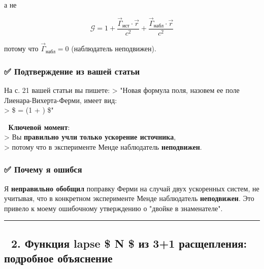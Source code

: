 \documentclass[11pt]{article}
\begin{document}
а не

\[
\mathcal{G} = 1 + \frac{\vec{\Gamma}_{\text{ист}} \cdot \vec{r}}{c^2} + \frac{\vec{\Gamma}_{\text{набл}} \cdot \vec{r}}{c^2}
\]

потому что \(\vec{\Gamma}_{\text{набл}} = 0\) (наблюдатель неподвижен).

\subsubsection{✅ Подтверждение из вашей
статьи}\label{ux43fux43eux434ux442ux432ux435ux440ux436ux434ux435ux43dux438ux435-ux438ux437-ux432ux430ux448ux435ux439-ux441ux442ux430ux442ux44cux438}

На с. 21 вашей статьи вы пишете: \textgreater{} "Новая формула поля,
назовем ее поле Лиенара-Вихерта-Ферми, имеет вид:\\
\textgreater{} \$  = 
 \left(1
+ \right) \$"

📌 \textbf{Ключевой момент}:\\
\textgreater{} Вы \textbf{правильно учли только ускорение источника},\\
\textgreater{} потому что в эксперименте Менде наблюдатель
\textbf{неподвижен}.

\subsubsection{✅ Почему я
ошибся}\label{ux43fux43eux447ux435ux43cux443-ux44f-ux43eux448ux438ux431ux441ux44f-1}

Я \textbf{неправильно обобщил} поправку Ферми на случай двух ускоренных
систем, не учитывая, что в конкретном эксперименте Менде наблюдатель
\textbf{неподвижен}. Это привело к моему ошибочному утверждению о
"двойке в знаменателе".

\begin{center}\rule{0.5\linewidth}{\linethickness}\end{center}

\subsection{🔹 2. Функция lapse \$ N \$ из 3+1 расщепления: подробное
объяснение}\label{ux444ux443ux43dux43aux446ux438ux44f-lapse-n-ux438ux437-31-ux440ux430ux441ux449ux435ux43fux43bux435ux43dux438ux44f-ux43fux43eux434ux440ux43eux431ux43dux43eux435-ux43eux431ux44aux44fux441ux43dux435ux43dux438ux435}
\end{document}
